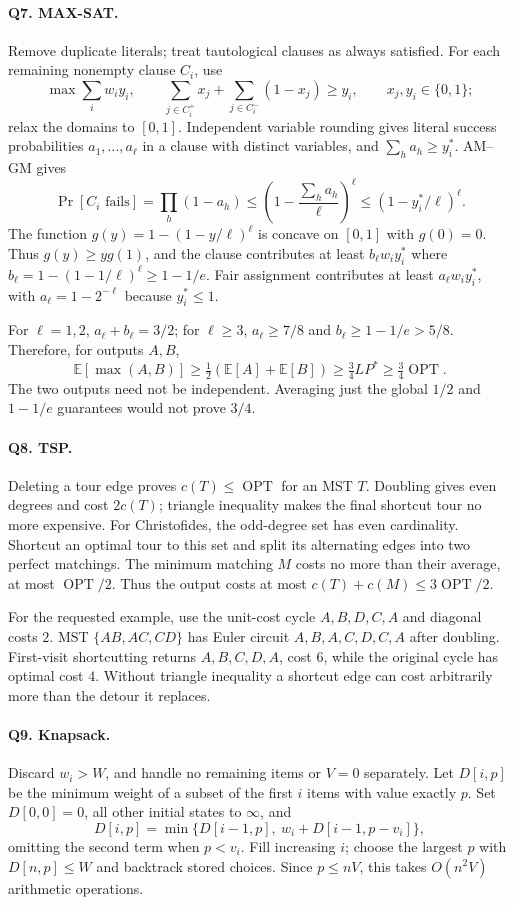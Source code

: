 \documentclass[10pt]{article}
\theoremstyle{definition}
\newcommand{\OPT}{\operatorname{OPT}}
\begin{document}
\paragraph{Q7. MAX-SAT.}
Remove duplicate literals; treat tautological clauses as always satisfied.
For each remaining nonempty clause $C_i$, use
\[
\max\sum_iw_iy_i,\qquad
\sum_{j\in C_i^+}x_j+\sum_{j\in C_i^-}(1-x_j)\ge y_i,
\qquad x_j,y_i\in\{0,1\};
\]
relax the domains to $[0,1]$.  Independent variable rounding gives literal
success probabilities $a_1,\ldots,a_\ell$ in a clause with distinct
variables, and $\sum_h a_h\ge y_i^*$.  AM--GM gives
\[
\Pr[C_i\text{ fails}]=\prod_h(1-a_h)
\le\left(1-\frac{\sum_h a_h}{\ell}\right)^\ell
\le(1-y_i^*/\ell)^\ell.
\]
The function $g(y)=1-(1-y/\ell)^\ell$ is concave on $[0,1]$ with
$g(0)=0$.  Thus $g(y)\ge yg(1)$, and the clause contributes at least
$b_\ell w_i y_i^*$ where $b_\ell=1-(1-1/\ell)^\ell\ge1-1/e$.
Fair assignment contributes at least $a_\ell w_i y_i^*$, with
$a_\ell=1-2^{-\ell}$ because $y_i^*\le1$.

For $\ell=1,2$, $a_\ell+b_\ell=3/2$; for $\ell\ge3$,
$a_\ell\ge7/8$ and $b_\ell\ge1-1/e>5/8$.  Therefore, for outputs $A,B$,
\[
\mathbb E[\max(A,B)]\ge\tfrac12(\mathbb E[A]+\mathbb E[B])
\ge\tfrac34 LP^*\ge\tfrac34\OPT.
\]
The two outputs need not be independent.  Averaging just the global
$1/2$ and $1-1/e$ guarantees would not prove $3/4$.

\paragraph{Q8. TSP.}
Deleting a tour edge proves $c(T)\le\OPT$ for an MST $T$.  Doubling gives
even degrees and cost $2c(T)$; triangle inequality makes the final shortcut
tour no more expensive.  For Christofides, the odd-degree set has even
cardinality.  Shortcut an optimal tour to this set and split its alternating
edges into two perfect matchings.  The minimum matching $M$ costs no more
than their average, at most $\OPT/2$.  Thus the output costs at most
$c(T)+c(M)\le3\OPT/2$.

For the requested example, use the unit-cost cycle $A,B,D,C,A$ and diagonal
costs $2$.  MST $\{AB,AC,CD\}$ has Euler circuit $A,B,A,C,D,C,A$ after
doubling.  First-visit shortcutting returns $A,B,C,D,A$, cost $6$, while
the original cycle has optimal cost $4$.  Without triangle inequality a
shortcut edge can cost arbitrarily more than the detour it replaces.

\paragraph{Q9. Knapsack.}
Discard $w_i>W$, and handle no remaining items or $V=0$ separately.
Let $D[i,p]$ be the minimum weight of a subset of the first $i$ items with
value exactly $p$.  Set $D[0,0]=0$, all other initial states to $\infty$, and
\[
D[i,p]=\min\{D[i-1,p],\ w_i+D[i-1,p-v_i]\},
\]
omitting the second term when $p<v_i$.  Fill increasing $i$; choose the
largest $p$ with $D[n,p]\le W$ and backtrack stored choices.  Since
$p\le nV$, this takes $O(n^2V)$ arithmetic operations.
\end{document}
